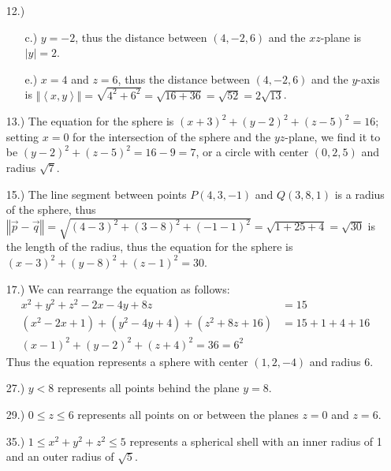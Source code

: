\documentclass[12pt]{article}
\newcommand{\angleb}[1]{\left\langle#1\right\rangle}
\begin{document}
\begin{itemize}
    \item [12.)] \begin{itemize}
        \item [c.)] $y=-2$, thus the distance between $(4,-2,6)$ and the $xz$-plane is $\vert y\vert=2$.

        \item [e.)] $x=4$ and $z=6$, thus the distance between $(4,-2,6)$ and the $y$-axis is $\Vert\angleb{x,y}\Vert=\sqrt{4^2+6^2}=\sqrt{16+36}=\sqrt{52}=2\sqrt{13}$.
    \end{itemize}

    \item [13.)] The equation for the sphere is $(x+3)^2+(y-2)^2+(z-5)^2=16$; setting $x=0$ for the intersection of the sphere and the $yz$-plane, we find it to be $(y-2)^2+(z-5)^2=16-9=7$, or a circle with center $(0,2,5)$ and radius $\sqrt{7}$.

    \item [15.)] The line segment between points $P(4,3,-1)$ and $Q(3,8,1)$ is a radius of the sphere, thus $\left\Vert{\Vec{p}-\Vec{q}}\right\Vert=\sqrt{(4-3)^2+(3-8)^2+(-1-1)^2}=\sqrt{1+25+4}=\sqrt{30}$ is the length of the radius, thus the equation for the sphere is $(x-3)^2+(y-8)^2+(z-1)^2=30$.

    \item [17.)] We can rearrange the equation as follows:
    \begin{align*}
        x^2+y^2+z^2-2x-4y+8z&=15\\
        (x^2-2x+1)+(y^2-4y+4)+(z^2+8z+16)&=15+1+4+16\\
        (x-1)^2+(y-2)^2+(z+4)^2=36=6^2
    \end{align*}
    Thus the equation represents a sphere with center $(1,2,-4)$ and radius 6.

    \item [27.)] $y<8$ represents all points behind the plane $y=8$.

    \item [29.)] $0\leq z\leq6$ represents all points on or between the planes $z=0$ and $z=6$.

    \item [35.)] $1\leq x^2+y^2+z^2\leq 5$ represents a spherical shell with an inner radius of 1 and an outer radius of $\sqrt{5}$.
\end{itemize}
\end{document}
